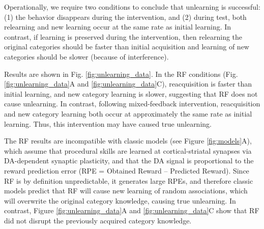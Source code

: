 \documentclass[apacite,draftfirst,jou]{apa6}
\begin{document}
Operationally, we require two conditions to conclude that unlearning is
successful: (1) the behavior disappears during the intervention, and (2) during
test, both relearning and new learning occur at the same rate as initial
learning. In contrast, if learning is preserved during the intervention, then
relearning the original categories should be faster than initial acquisition and
learning of new categories should be slower (because of interference).

Results are shown in Fig. \ref{fig:unlearning_data}. In the RF conditions (Fig.
\ref{fig:unlearning_data}A and \ref{fig:unlearning_data}C), reacquisition is
faster than initial learning, and new category learning is slower, suggesting
that RF does not cause unlearning. In contrast, following mixed-feedback
intervention, reacquisition and new category learning both occur at
approximately the same rate as initial learning. Thus, this intervention may
have caused true unlearning.

The RF results are incompatible with classic models (see Figure
\ref{fig:models}A), which assume that procedural skills are learned at
cortical-striatal synapses via DA-dependent synaptic plasticity, and that the DA
signal is proportional to the reward prediction error (RPE = Obtained Reward --
Predicted Reward). Since RF is by definition unpredictable, it generates large
RPEs, and therefore classic models predict that RF will cause new learning of
random associations, which will overwrite the original category knowledge,
causing true unlearning. In contrast, Figure \ref{fig:unlearning_data}A and
\ref{fig:unlearning_data}C show that RF did not disrupt the previously acquired
category knowledge.
\end{document}
